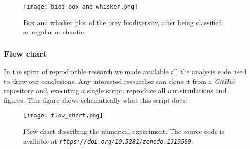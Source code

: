 \begin{figure}[H]
	\begin{center}
		\texttt{[image: biod\_box\_and\_whisker.png]}
	\end{center}
	\caption{Box and whisker plot of the prey biodiversity, after being classified as regular or chaotic.}
	\label{fig:BiodBoxAndWhisker}
\end{figure}

\subsubsection{Flow chart}
\label{subsubsec:FlowChart}
In the spirit of reproducible research we made available all the analysis code used to draw our conclusions. Any interested researcher can clone it from a \textit{GitHub} repository \citep{Rodriguez-Sanchez-code-neuchaos} and, executing a single script, reproduce all our simulations and figures. This figure shows schematically what this script does:

\begin{figure}[H]
	\begin{center}
		\texttt{[image: flow\_chart.png]}
	\end{center}
	\caption{Flow chart describing the numerical experiment. The source code is available at \textit{\texttt{https://doi.org/10.5281/zenodo.1319590}}.}
	\label{fig:FlowChart}
\end{figure}
